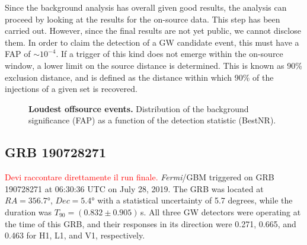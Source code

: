 \documentclass[binding=0.6cm, LaM]{sapthesis}
\newcommand{\fpg}[1]{\textcolor{red}{#1} }
\begin{document}
	Since the background analysis has overall given good results,
	the analysis can proceed by looking at the results for the on-source data.
	This step has been carried out. However, since the final results are not yet public, we cannot disclose them.
	In order to claim the detection of a GW candidate event, this 
	must have a FAP of $\sim 10^{-4}$.  If a trigger of this kind does not emerge within the on-source window,
	a lower limit on the source distance is determined. 
        This is known as 90\% exclusion distance, and is
	defined as the distance within which 90\% of the injections of a given set is recovered.

        \begin{figure}[!t]
          \noindent
          \label{loudestoffsourcevent1}
          \centering
          \caption{\textbf{Loudest offsource events.} Distribution of the background significance (FAP) as a function of the detection statistic (BestNR).}
          \label{fig:loudestoffsourcevent1}
        \end{figure}

\subsection{GRB 190728271}
\fpg{Devi raccontare direttamente il run finale.}
        {\it Fermi}/GBM triggered on GRB 190728271 at 06:30:36 UTC on July 28, 2019.
        The GRB was located at $RA = \ang{356.7}$, $Dec = \ang{5.4}$
        with a statistical uncertainty of 5.7 degrees, while the duration was $T_{90} = (0.832 \pm 0.905)\,$s.
        All three GW detectors were operating at the time of this GRB,
        and their responses in its direction were 0.271, 0.665, and 0.463 for H1, L1, and V1, respectively.
\end{document}
